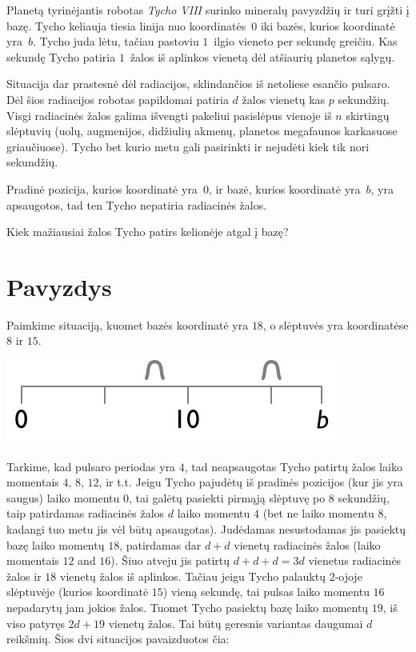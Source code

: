 

\noindent
Planetą tyrinėjantis robotas \emph{Tycho VIII} surinko mineralų pavyzdžių ir turi grįžti į bazę.
Tycho keliauja tiesia linija nuo koordinatės~$0$ iki bazės, kurios koordinatė yra~$b$.
Tycho juda lėtu, tačiau pastoviu $1$~ilgio vieneto per sekundę greičiu.
Kas sekundę Tycho patiria $1$~žalos iš aplinkos vienetą dėl atšiaurių planetos sąlygų.

Situacija dar prastesnė dėl radiacijos, sklindančios iš netoliese esančio pulsaro. 
Dėl šios radiacijos robotas papildomai patiria $d$ žalos vienetų kas $p$ sekundžių.
Visgi radiacinės žalos galima išvengti pakeliui pasislėpus vienoje iš $n$ skirtingų slėptuvių 
(uolų, augmenijos, didžiulių akmenų, planetos megafaunos karkasuose griaučiuose).
Tycho bet kurio metu gali pasirinkti ir nejudėti kiek tik nori sekundžių.

Pradinė pozicija, kurios koordinatė yra~$0$, ir bazė, kurios koordinatė yra~$b$, yra apsaugotos,
tad ten Tycho nepatiria radiacinės žalos.

\medskip
Kiek mažiausiai žalos Tycho patirs kelionėje atgal į bazę?

\section*{Pavyzdys}

Paimkime situaciją, kuomet bazės koordinatė yra $18$, o slėptuvės yra koordinatėse $8$ ir $15$.

\includegraphics[width=.3\textwidth]{img/samplesetup}

Tarkime, kad pulsaro periodas yra $4$, tad neapsaugotas Tycho patirtų žalos laiko momentais $4$, $8$, $12$, ir t.t.
Jeigu Tycho pajudėtų iš pradinės pozicijos (kur jis yra saugus) laiko momentu $0$, tai galėtų pasiekti pirmąją slėptuvę po $8$ sekundžių, taip patirdamas radiacinės žalos $d$ laiko momentu $4$ (bet ne laiko momentu $8$, kadangi tuo metu jis vėl būtų apsaugotas).
Judėdamas nesustodamas jis pasiektų bazę laiko momentų $18$, patirdamas dar $d+d$ vienetų radiacinės žalos (laiko momentais $12$ and $16$).
Šiuo atveju jis patirtų $d+d+d=3d$ vienetus radiacinės žalos ir
$18$ vienetų žalos iš aplinkos.
Tačiau jeigu Tycho palauktų $2$-ojoje slėptuvėje (kurios koordinatė $15$) vieną sekundę, tai pulsas laiko momentu $16$ nepadarytų jam jokios žalos. Tuomet Tycho pasiektų bazę laiko momentų $19$, iš viso patyręs $2d + 19$ vienetų žalos.
Tai būtų geresnis variantas daugumai $d$ reikšmių.
Šios dvi situacijos pavaizduotos čia:

